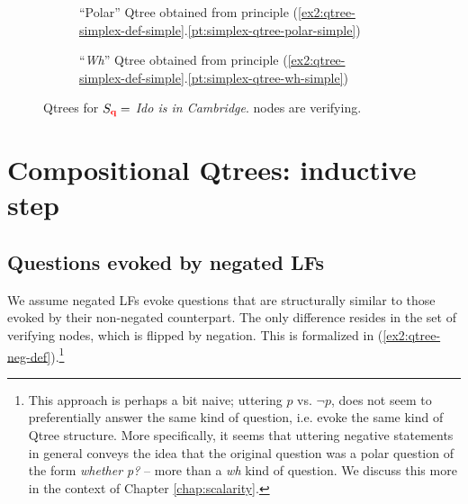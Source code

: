 \begin{figure}[H]
	\centering
	\begin{subfigure}[b]{.3\linewidth}
		\centering
		\scalebox{1}{
			\begin{forest}
				[CS [\fbox{$\q$}][$\neg \q$]]
			\end{forest}
		}
		\caption{``Polar'' Qtree obtained from principle (\ref{ex2:qtree-simplex-def-simple}.\ref{pt:simplex-qtree-polar-simple})}\label{fig2:qtree-q-polar}
	\end{subfigure}\qquad
	\begin{subfigure}[b]{.3\linewidth}
		\centering
		\scalebox{1}{
			\begin{forest}
				[CS [$\p$][\fbox{$\q$}][$\r$][...]]
			\end{forest}
		}
		\caption{``\textit{Wh}'' Qtree obtained from principle (\ref{ex2:qtree-simplex-def-simple}.\ref{pt:simplex-qtree-wh-simple})}\label{fig2:qtree-q-wh}
	\end{subfigure}
	\caption{Qtrees for $S\protect_{\textbf{\textcolor{red}{q}}}=$ \textit{Ido is in Cambridge}. \setlength{\fboxsep}{1pt} nodes are verifying.}
	\label{fig2:qtrees-q}
\end{figure}


\section{Compositional Qtrees: inductive step}
\subsection{Questions evoked by negated LFs}\label{sec:neg}
We assume negated LFs evoke questions that are structurally similar to those evoked by their non-negated counterpart. The only difference resides in the set of verifying nodes, which is flipped by negation. This is formalized in (\ref{ex2:qtree-neg-def}).\footnote{This approach is perhaps a bit naive; uttering $p$ vs. $\neg p$, does not seem to preferentially answer the same kind of question, i.e. evoke the same kind of Qtree structure. More specifically, it seems that uttering negative statements in general conveys the idea that the original question was a polar question of the form \textit{whether p?} -- more than a \textit{wh} kind of question. We discuss this more in the context of Chapter \ref{chap:scalarity}.}

